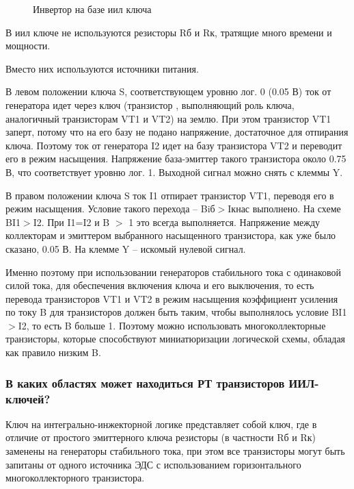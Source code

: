  

\begin{center}
	\begin{figure}[h!]
		\caption{Инвертор на базе иил ключа}	
		\label{iil3}
	\end{figure}
\end{center}



В иил ключе не используются резисторы Rб и Rк, тратящие много времени и мощности. 

Вместо них используются источники питания. 

В левом положении ключа S, соответствующем уровню  лог. 0 (0.05 В) ток от генератора идет через ключ (транзистор , выполняющий роль ключа, аналогичный транзисторам VT1 и VT2) на землю. При этом транзистор VT1 заперт, потому что на его базу не подано напряжение, достаточное для отпирания ключа. Поэтому ток от генератора I2 идет на базу транзистора VT2 и переводит его в режим насыщения. Напряжение база-эмиттер такого транзистора около 0.75 В, что соответствует уровню лог. 1. Выходной сигнал можно снять с клеммы Y.

В правом положении ключа S ток I1 отпирает транзистор VT1, переводя его в режим насыщения. Условие такого перехода -- Biб$>$Iкнас выполнено. На схеме BI1$>$I2. При I1=I2 и B $>$ 1 это всегда выполняется. Напряжение между коллекторам и эмиттером выбранного насыщенного транзистора, как уже было сказано, 0.05 В. На клемме Y -- искомый нулевой сигнал.

Именно поэтому при использовании генераторов стабильного тока с одинаковой силой тока, для обеспечения включения ключа и его выключения, то есть перевода транзисторов VT1 и VT2 в режим насыщения коэффициент усиления по току B для транзисторов должен быть таким, чтобы выполнялось условие BI1$>$I2, то есть B больше 1. Поэтому можно использовать многоколлекторные транзисторы, которые способствуют миниатюризации логической схемы, обладая как правило низким B.

\subsubsection{В каких областях может находиться РТ транзисторов ИИЛ-ключей?}

Ключ на интегрально-инжекторной логике представляет собой ключ, где в отличие от простого эмиттерного ключа резисторы (в частности Rб и Rк) заменены на генераторы стабильного тока, при этом все транзисторы могут быть запитаны от одного источника ЭДС с использованием горизонтального многоколлекторного транзистора.

